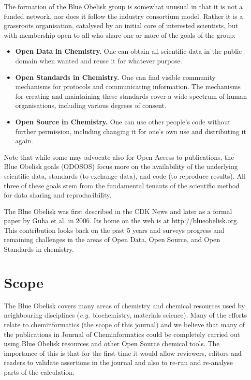 \documentclass[10pt]{bmc_article}
\newenvironment{bmcformat}{\begin{raggedright}\baselineskip20pt\sloppy\setboolean{publ}{false}}{\end{raggedright}\baselineskip20pt\sloppy}
\begin{document}
\begin{bmcformat}
The formation of the Blue Obelisk group is somewhat unusual in that it
is not a funded network, nor does it follow the industry consortium
model. Rather it is a grassroots organisation, catalysed by an initial
core of interested scientists, but with membership open to all who
share one or more of the goals of the group:
\begin{itemize}
\item {\bf Open Data in Chemistry.} One can obtain all scientific data in the public domain when
wanted and reuse it for whatever purpose.
\item {\bf Open Standards in Chemistry.} One can find visible community mechanisms for
protocols and communicating information. The mechanisms for creating
and maintaining these standards cover a wide spectrum of human
organisations, including various degrees of consent.
\item {\bf Open Source in Chemistry.} One can use other people's code without further
permission, including changing it for one's own use and distributing
it again.
\end{itemize}

Note that while some may advocate also for Open Access to
publications, the Blue Obelisk goals (ODOSOS) focus more on the
availability of the underlying scientific data, standards (to exchange
data), and code (to reproduce results). All three of these goals stem
from the fundamental tenants of the scientific method for data sharing
and reproducibility.

The Blue Obelisk was first described in the CDK News \cite{CDKNewsBO} and
later as a formal paper by Guha et al.\cite{Guha2006} in
2006. Its home on the web is at http://blueobelisk.org.
This contribution looks back on the past 5 years and surveys
progress and remaining challenges in the areas of Open Data, Open
Source, and Open Standards in chemistry.


\section*{Scope}
The Blue Obelisk covers many areas of chemistry and chemical resources
used by neighbouring disciplines ({\it e.g.} biochemistry, materials
science). Many of the efforts relate to cheminformatics (the scope of
this journal) and we believe that many of the publications in Journal of
Cheminformatics could be completely carried out using Blue Obelisk resources
and other Open Source chemical tools. The importance of this is that for the
first time it would allow reviewers, editors and readers to validate
assertions in the journal and also to re-run and re-analyse parts of
the calculation.


\end{bmcformat}
\end{document}
